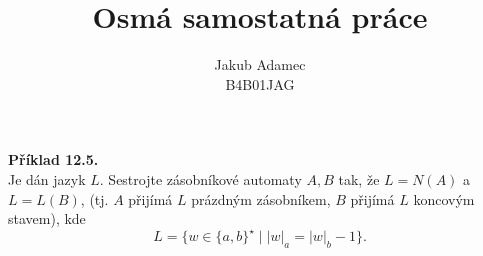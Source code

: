 \documentclass[11pt]{article}
\begin{document}

\newcommand\splitpage[2]{
      \begin{minipage}[t]{0.45\textwidth}#1
      \end{minipage}%
      \hfill
      \begin{minipage}[t]{0.45\textwidth}#2
      \end{minipage}
}
 
 
\title{\textbf{Osmá samostatná práce}}
\author{Jakub Adamec\\ %
B4B01JAG} %

\maketitle

\noindent
\textbf{Příklad 12.5.}\\
Je dán jazyk $L$. Sestrojte zásobníkové automaty $A, B$ tak, že $L = N(A)$ a $L = L(B)$, (tj. $A$ přijímá $L$ prázdným zásobníkem, $B$ přijímá $L$ koncovým stavem), kde
\[L = \{w \in \{a,b\}^\star \mid |w|_a = |w|_b -1\}\text{.}\]

 
\end{document}
